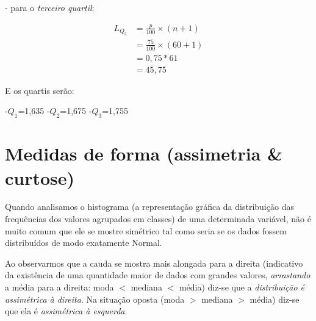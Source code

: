 \documentclass[
]{book}
\begin{document}
\hfill\break
- para o \emph{terceiro quartil}:

\begin{align*}
L_{Q_{3}} & =\frac{p}{100} \times (n+1) \\
          & =\frac{75}{100} \times (60+1) \\
          & = 0,75*61 \\
          & = 45,75
\end{align*}

\hfill\break

E os quartis serão:

\hfill\break

-\(Q_{1}\)=1,635
-\(Q_{2}\)=1,675
-\(Q_{3}\)=1,755

\hfill\break

\hypertarget{medidas-de-forma-assimetria-curtose}{%
\section{Medidas de forma (assimetria \& curtose)}\label{medidas-de-forma-assimetria-curtose}}

\hfill\break

Quando analisamos o histograma (a representação gráfica da distribuição das frequências dos valores agrupados em classes) de uma determinada variável, não é muito comum que ele se mostre simétrico tal como seria se os dados fossem distribuídos de modo exatamente Normal.

\hfill\break

Ao observarmos que a cauda se mostra mais alongada para a direita (indicativo da existência de uma quantidade maior de dados com grandes valores, \emph{arrastando} a média para a direita: moda \(<\) mediana \(<\) média) diz-se que a \emph{distribuição é assimétrica à direita}. Na situação oposta (moda \(>\) mediana \(>\) média) diz-se que ela é \emph{assimétrica à esquerda}.

\hfill\break
\end{document}
